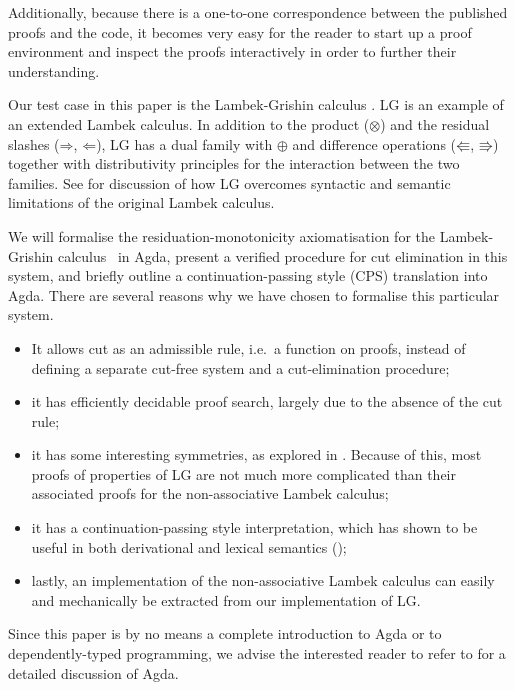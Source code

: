 \documentclass[a4paper]{llncs}
\newcommand{\Varid}[1]{\mathit{#1}}
\renewcommand\Varid[1]{\mathord{\textsf{#1}}}
\begin{document}
Additionally, because there is a one-to-one correspondence between the
published proofs and the code, it becomes very easy for the reader to
start up a proof environment and inspect the proofs interactively in
order to further their understanding.


Our test case in this paper is the Lambek-Grishin calculus \citep[LG,
][]{moortgat2009}. LG is an example of an extended Lambek calculus. In
addition to the product (\ensuremath{\Varid{⊗}}) and the residual slashes (\ensuremath{\Varid{⇒}}, \ensuremath{\Varid{⇐}}), LG
has a dual family with \ensuremath{\Varid{⊕}} and difference operations (\ensuremath{\Varid{⇚}}, \ensuremath{\Varid{⇛}})
together with distributivity principles for the interaction between
the two families. See \citet{moortgat2009} for discussion of how LG
overcomes syntactic and semantic limitations of the original Lambek
calculus.

We will formalise the residuation-monotonicity axiomatisation for the
Lambek-Grishin calculus~\citep{moortgat2007} in Agda, present a
verified procedure for cut elimination in this system, and briefly
outline a continuation-passing style (CPS) translation into
Agda. There are several reasons why we have chosen to formalise this
particular system.
\begin{itemize}
\item%
  It allows cut as an admissible rule, i.e.\ a function on proofs,
  instead of defining a separate cut-free system and a cut-elimination
  procedure;
\item%
  it has efficiently decidable proof search, largely due to the
  absence of the cut rule;
\item%
  it has some interesting symmetries, as explored in
  \citet{moortgat2007,moortgat2009}. Because of this, most proofs of
  properties of LG are not much more complicated than their associated
  proofs for the non-associative Lambek calculus;
\item
  it has a continuation-passing style interpretation, which has shown to
  be useful in both derivational and lexical semantics
  (\citeauthor{moortgat2007,bs2015,asher2011});
\item%
  lastly, an implementation of the non-associative Lambek calculus can
  easily and mechanically be extracted from our implementation of LG.
\end{itemize}
Since this paper is by no means a complete introduction to Agda or to
dependently-typed programming, we advise the interested reader to
refer to \citet{norell2009} for a detailed discussion of Agda.
\end{document}
